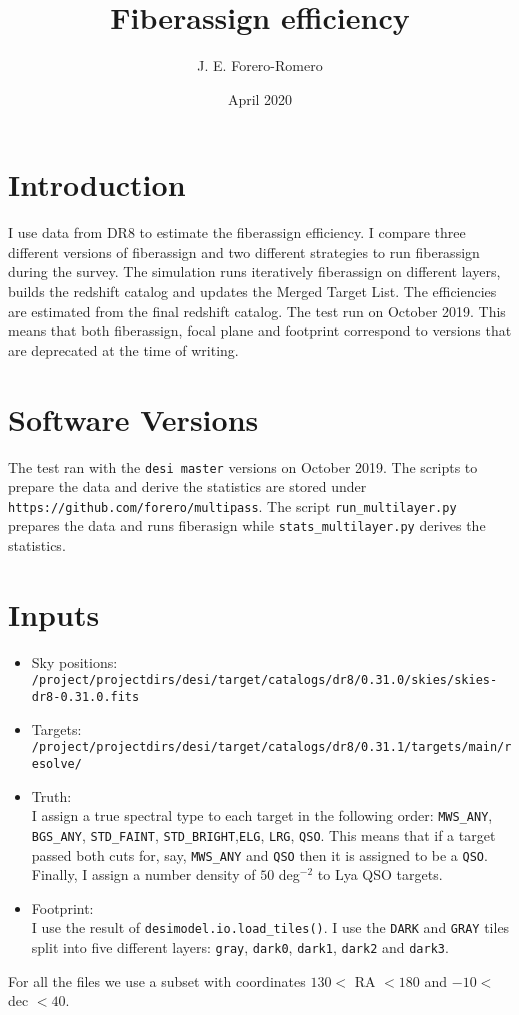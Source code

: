 \documentclass{article}
\title{Fiberassign efficiency}
\author{J. E. Forero-Romero}
\date{April 2020}
\begin{document}
\maketitle

\section{Introduction}
I use data from DR8 to estimate the fiberassign efficiency.
I compare three different versions of fiberassign and two different
strategies to run fiberassign during the survey. 
The simulation runs iteratively fiberassign on different layers,
builds the redshift catalog and updates the Merged Target List.
The efficiencies are estimated from the final redshift catalog.
The test run on October 2019. This means that both fiberassign, focal
plane and footprint correspond to versions that are deprecated at the
time of writing.

\section{Software Versions}

The test ran with the \verb'desi master' versions on October 2019. 
The scripts to prepare the data and derive the statistics are stored
under \verb"https://github.com/forero/multipass". 
The script \verb'run_multilayer.py' prepares the data and runs fiberasign while
\verb'stats_multilayer.py' derives the statistics. 

\section{Inputs}

\begin{itemize}
\item Sky positions: \\
\verb"/project/projectdirs/desi/target/catalogs/dr8/0.31.0/skies/skies-dr8-0.31.0.fits"
\item Targets:\\
\verb"/project/projectdirs/desi/target/catalogs/dr8/0.31.1/targets/main/resolve/"
\item Truth:\\
I assign a true spectral type to each target in the
following order:
\verb'MWS_ANY', \verb'BGS_ANY', \verb'STD_FAINT',
\verb'STD_BRIGHT',\verb'ELG', \verb'LRG', \verb'QSO'.
This means that if a target passed both cuts for, say, \verb'MWS_ANY' and
\verb'QSO' then it is assigned to be a \verb'QSO'.
Finally, I assign a number density of $50$ deg$^{-2}$
to Lya QSO targets.

\item Footprint:\\
I use the result of \verb'desimodel.io.load_tiles()'.
I use the \verb"DARK" and \verb"GRAY" tiles split into 
five different layers: \verb`gray`,
\verb'dark0', \verb'dark1', \verb'dark2' and \verb'dark3'.

\end{itemize}
For all the files we use a subset with coordinates 
$130<$ RA $<180$ and
$-10<$ dec $<40$. 
\end{document}
